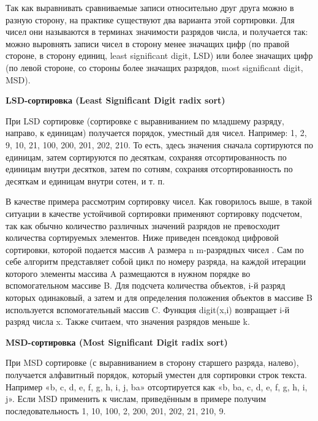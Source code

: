 \documentclass[a4paper, 14pt]{article}
\begin{document}
Так как выравнивать сравниваемые записи относительно друг друга можно в разную сторону, на практике существуют два варианта этой сортировки. Для чисел они называются в терминах значимости разрядов числа, и получается так: можно выровнять записи чисел в сторону менее значащих цифр (по правой стороне, в сторону единиц, least significant digit, LSD) или более значащих цифр (по левой стороне, со стороны более значащих разрядов, most significant digit, MSD).

\begin{doublespace}
\large
\textbf{LSD-сортировка (Least Significant Digit radix sort)}
\normalsize
\end{doublespace}

При LSD сортировке (сортировке с выравниванием по младшему разряду, направо, к единицам) получается порядок, уместный для чисел. Например: 1, 2, 9, 10, 21, 100, 200, 201, 202, 210. То есть, здесь значения сначала сортируются по единицам, затем сортируются по десяткам, сохраняя отсортированность по единицам внутри десятков, затем по сотням, сохраняя отсортированность по десяткам и единицам внутри сотен, и т. п.

В качестве примера рассмотрим сортировку чисел. Как говорилось выше, в такой ситуации в качестве устойчивой сортировки применяют сортировку подсчетом, так как обычно количество различных значений разрядов не превосходит количества сортируемых элементов. Ниже приведен псевдокод цифровой сортировки, которой подается массив A размера n m-разрядных чисел . Сам по себе алгоритм представляет собой цикл по номеру разряда, на каждой итерации которого элементы массива A размещаются в нужном порядке во вспомогательном массиве B. Для подсчета количества объектов, i-й разряд которых одинаковый, а затем и для определения положения объектов в массиве B используется вспомогательный массив C. Функция digit(x,i) возвращает i-й разряд числа x. Также считаем, что значения разрядов меньше k.

\begin{doublespace}
\large
\textbf{MSD-сортировка (Most Significant Digit radix sort)}
\normalsize
\end{doublespace}

При MSD сортировке (с выравниванием в сторону старшего разряда, налево), получается алфавитный порядок, который уместен для сортировки строк текста. Например «b, c, d, e, f, g, h, i, j, ba» отсортируется как «b, ba, c, d, e, f, g, h, i, j». Если MSD применить к числам, приведённым в примере получим последовательность 1, 10, 100, 2, 200, 201, 202, 21, 210, 9.
\end{document}
